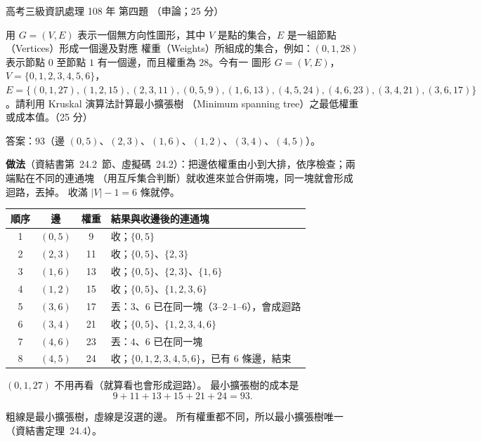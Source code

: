 \begin{pastexam}[label={px:gk3-108-ds-04}]{高考三級資訊處理 108 年 第四題}
（申論；25 分）

用 $G = (V, E)$ 表示一個無方向性圖形，其中 $V$ 是點的集合，$E$ 是一組節點（Vertices）形成一個邊及對應
權重（Weights）所組成的集合，例如：$(0, 1, 28)$ 表示節點 $0$ 至節點 $1$ 有一個邊，而且權重為 $28$。今有一
圖形 $G = (V, E)$，$V = \{0, 1, 2, 3, 4, 5, 6\}$，$E = \{(0, 1, 27), (1, 2, 15), (2, 3, 11), (0, 5, 9),
(1, 6, 13), (4, 5, 24), (4, 6, 23), (3, 4, 21), (3, 6, 17)\}$。請利用 Kruskal 演算法計算最小擴張樹
（Minimum spanning tree）之最低權重或成本值。（25 分）
\end{pastexam}

\begin{pastsoln}
答案：$93$（邊 $(0,5)$、$(2,3)$、$(1,6)$、$(1,2)$、$(3,4)$、$(4,5)$）。

\textbf{做法}（資結書第~24.2~節、虛擬碼~24.2）：把邊依權重由小到大排，依序檢查；兩端點在不同的連通塊
（用互斥集合判斷）就收進來並合併兩塊，同一塊就會形成迴路，丟掉。 收滿 $|V| - 1 = 6$ 條就停。
\begin{center}
\begin{tabular}{cccl}
\toprule
順序 & 邊 & 權重 & 結果與收邊後的連通塊 \\
\midrule
1 & $(0,5)$ & 9 & 收；$\{0,5\}$ \\
2 & $(2,3)$ & 11 & 收；$\{0,5\}$、$\{2,3\}$ \\
3 & $(1,6)$ & 13 & 收；$\{0,5\}$、$\{2,3\}$、$\{1,6\}$ \\
4 & $(1,2)$ & 15 & 收；$\{0,5\}$、$\{1,2,3,6\}$ \\
5 & $(3,6)$ & 17 & 丟：$3$、$6$ 已在同一塊（$3$--$2$--$1$--$6$），會成迴路 \\
6 & $(3,4)$ & 21 & 收；$\{0,5\}$、$\{1,2,3,4,6\}$ \\
7 & $(4,6)$ & 23 & 丟：$4$、$6$ 已在同一塊 \\
8 & $(4,5)$ & 24 & 收；$\{0,1,2,3,4,5,6\}$，已有 $6$ 條邊，結束 \\
\bottomrule
\end{tabular}
\end{center}
$(0,1,27)$ 不用再看（就算看也會形成迴路）。 最小擴張樹的成本是
\[
9 + 11 + 13 + 15 + 21 + 24 = 93.
\]
\begin{center}
\end{center}
粗線是最小擴張樹，虛線是沒選的邊。 所有權重都不同，所以最小擴張樹唯一（資結書定理~24.4）。
\end{pastsoln}
